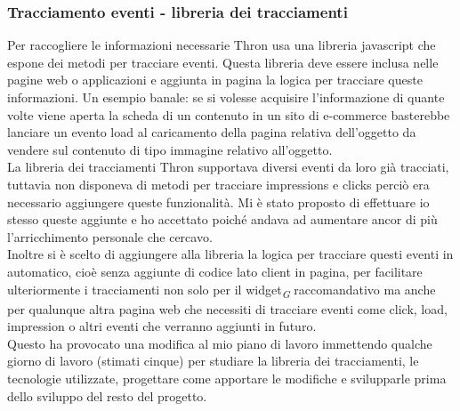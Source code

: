\documentclass[a4paper, 12pt, twoside, openright]{book}
\newcommand{\gloss}[1]{#1\textsubscript{\textit{\tiny{G}}}}
\begin{document}
\subsubsection{Tracciamento eventi - libreria dei tracciamenti}
Per raccogliere le informazioni necessarie Thron usa una libreria javascript che espone dei metodi per tracciare eventi. Questa libreria deve essere inclusa nelle pagine web o applicazioni e aggiunta in pagina la logica per tracciare queste informazioni. Un esempio banale: se si volesse acquisire l'informazione di quante volte viene aperta la scheda di un contenuto in un sito di e-commerce basterebbe lanciare un evento load al caricamento della pagina relativa dell'oggetto da vendere sul contenuto di tipo immagine relativo all'oggetto.\\
La libreria dei tracciamenti Thron supportava diversi eventi da loro già tracciati, tuttavia non disponeva di metodi per tracciare impressions e clicks perciò era necessario aggiungere queste funzionalità. Mi è stato proposto di effettuare io stesso queste aggiunte e ho accettato poiché andava ad aumentare ancor di più l'arricchimento personale che cercavo.\\
Inoltre si è scelto di aggiungere alla libreria la logica per tracciare questi eventi in automatico, cioè senza aggiunte di codice lato client in pagina, per facilitare ulteriormente i tracciamenti non solo per il \gloss{widget} raccomandativo ma anche per qualunque altra pagina web che necessiti di tracciare eventi come click, load, impression o altri eventi che verranno aggiunti in futuro.\\
Questo ha provocato una modifica al mio piano di lavoro immettendo qualche giorno di lavoro (stimati cinque) per studiare la libreria dei tracciamenti, le tecnologie utilizzate, progettare come apportare le modifiche e svilupparle prima dello sviluppo del resto del progetto.\\
\end{document}

